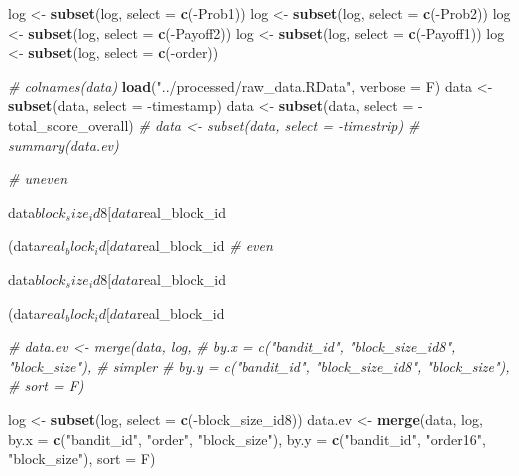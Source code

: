 \documentclass[11pt,,]{article}
\newenvironment{Shaded}{\begin{snugshade}}{\end{snugshade}}
\newcommand{\KeywordTok}[1]{\textcolor[rgb]{0.13,0.29,0.53}{\textbf{{#1}}}}
\newcommand{\DataTypeTok}[1]{\textcolor[rgb]{0.13,0.29,0.53}{{#1}}}
\newcommand{\DecValTok}[1]{\textcolor[rgb]{0.00,0.00,0.81}{{#1}}}
\newcommand{\StringTok}[1]{\textcolor[rgb]{0.31,0.60,0.02}{{#1}}}
\newcommand{\CommentTok}[1]{\textcolor[rgb]{0.56,0.35,0.01}{\textit{{#1}}}}
\newcommand{\NormalTok}[1]{{#1}}
\begin{document}
\begin{Shaded}
\begin{Highlighting}[]
\NormalTok{log <-}\StringTok{ }\KeywordTok{subset}\NormalTok{(log, }\DataTypeTok{select =} \KeywordTok{c}\NormalTok{(-Prob1))}
\NormalTok{log <-}\StringTok{ }\KeywordTok{subset}\NormalTok{(log, }\DataTypeTok{select =} \KeywordTok{c}\NormalTok{(-Prob2))}
\NormalTok{log <-}\StringTok{ }\KeywordTok{subset}\NormalTok{(log, }\DataTypeTok{select =} \KeywordTok{c}\NormalTok{(-Payoff2))}
\NormalTok{log <-}\StringTok{ }\KeywordTok{subset}\NormalTok{(log, }\DataTypeTok{select =} \KeywordTok{c}\NormalTok{(-Payoff1))}
\NormalTok{log <-}\StringTok{ }\KeywordTok{subset}\NormalTok{(log, }\DataTypeTok{select =} \KeywordTok{c}\NormalTok{(-order))}
\end{Highlighting}
\end{Shaded}

\begin{Shaded}
\begin{Highlighting}[]
\CommentTok{# colnames(data)}
\KeywordTok{load}\NormalTok{(}\StringTok{"../processed/raw_data.RData"}\NormalTok{, }\DataTypeTok{verbose =} \NormalTok{F)}
\NormalTok{data <-}\StringTok{ }\KeywordTok{subset}\NormalTok{(data, }\DataTypeTok{select =} \NormalTok{-timestamp)}
\NormalTok{data <-}\StringTok{ }\KeywordTok{subset}\NormalTok{(data, }\DataTypeTok{select =} \NormalTok{-total_score_overall)}
\CommentTok{# data <- subset(data, select = -timestrip)}
\CommentTok{# summary(data.ev)}


\CommentTok{# uneven}
\NormalTok{data$block_size_id8[data$real_block_id %%}\StringTok{ }\DecValTok{2} \NormalTok{==}\StringTok{ }\DecValTok{1}\NormalTok{] =}
\StringTok{    }\NormalTok{(data$real_block_id[data$real_block_id %%}\StringTok{ }\DecValTok{2} \NormalTok{==}\StringTok{ }\DecValTok{1}\NormalTok{] +}\StringTok{ }\DecValTok{1}\NormalTok{)/}\DecValTok{2}
\CommentTok{# even}
\NormalTok{data$block_size_id8[data$real_block_id %%}\StringTok{ }\DecValTok{2} \NormalTok{==}\StringTok{ }\DecValTok{0}\NormalTok{] =}
\StringTok{    }\NormalTok{(data$real_block_id[data$real_block_id %%}\StringTok{ }\DecValTok{2} \NormalTok{==}\StringTok{ }\DecValTok{0}\NormalTok{])/}\DecValTok{2}



\CommentTok{# data.ev <- merge(data, log,}
\CommentTok{#                by.x = c("bandit_id", "block_size_id8", "block_size"), # simpler }
\CommentTok{#                by.y = c("bandit_id", "block_size_id8", "block_size"), }
\CommentTok{#                sort = F)}

\NormalTok{log <-}\StringTok{ }\KeywordTok{subset}\NormalTok{(log, }\DataTypeTok{select =} \KeywordTok{c}\NormalTok{(-block_size_id8))}
\NormalTok{data.ev <-}\StringTok{ }\KeywordTok{merge}\NormalTok{(data, log,}
                 \DataTypeTok{by.x =} \KeywordTok{c}\NormalTok{(}\StringTok{"bandit_id"}\NormalTok{, }\StringTok{"order"}\NormalTok{, }\StringTok{"block_size"}\NormalTok{), }
                 \DataTypeTok{by.y =} \KeywordTok{c}\NormalTok{(}\StringTok{"bandit_id"}\NormalTok{, }\StringTok{"order16"}\NormalTok{, }\StringTok{"block_size"}\NormalTok{), }
                 \DataTypeTok{sort =} \NormalTok{F)}

}}}}
\end{Highlighting}
\end{Shaded}
\end{document}
